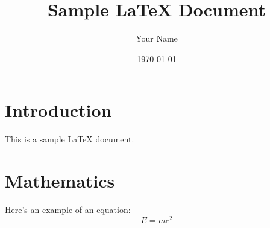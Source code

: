 \documentclass{article}
\title{Sample LaTeX Document}
\author{Your Name}
\date{\today}
\begin{document}
\maketitle

\section{Introduction}
This is a sample LaTeX document.

\section{Mathematics}
Here's an example of an equation:
\[
E = mc^2
\]
\end{document}

